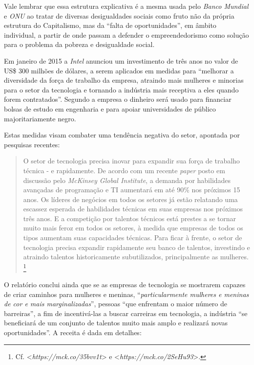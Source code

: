 Vale lembrar que essa estrutura explicativa é a mesma usada pelo
\emph{Banco Mundial} e \emph{ONU} ao tratar de diversas desigualdades
sociais como fruto não da própria estrutura do Capitalismo, mas da
``falta de oportunidades'', em âmbito individual, a partir de onde
passam a defender o empreendedorismo como solução para o problema da
pobreza e desigualdade social.

Em janeiro de 2015 a \emph{Intel} anunciou um investimento de três anos
no valor de US\$ 300 milhões de dólares, a serem aplicados em medidas
para ``melhorar a diversidade da força de trabalho da empresa, atraindo
mais mulheres e minorias para o setor da tecnologia e tornando a
indústria mais receptiva a eles quando forem contratados''. Segundo a
empresa o dinheiro será usado para financiar bolsas de estudo em
engenharia e para apoiar universidades de público majoritariamente
negro.

Estas medidas visam combater uma tendência negativa do setor, apontada
por pesquisas recentes:

\begin{quote}
O setor de tecnologia precisa inovar para expandir sua força de trabalho
técnica - e rapidamente. De acordo com um recente \emph{paper} posto em
discussão pelo \emph{McKinsey Global Institute}, a demanda por
habilidades avançadas de programação e TI aumentará em até 90\% nos
próximos 15 anos. Os líderes de negócios em todos os setores já estão
relatando uma escassez esperada de habilidades técnicas em suas empresas
nos próximos três anos. E a competição por talentos técnicos está
prestes a se tornar muito mais feroz em todos os setores, à medida que
empresas de todos os tipos aumentam suas capacidades técnicas. Para
ficar à frente, o setor de tecnologia precisa expandir rapidamente seu
banco de talentos, investindo e atraindo talentos historicamente
subutilizados, principalmente as mulheres. \footnote{Cf.
  \textless{}\emph{https://mck.co/35bvv1t}\textgreater{}
  e \textless{}\emph{https://mck.co/2SeHu93}\textgreater{}.}
\end{quote}

O relatório conclui ainda que se as empresas de tecnologia se mostrarem
capazes de criar caminhos para mulheres e meninas,
``\emph{particularmente mulheres e meninas de cor e mais
marginalizadas}'', pessoas ``que enfrentam o maior número de
barreiras'', a fim de incentivá-las a buscar carreiras em tecnologia, a
indústria ``se beneficiará de um conjunto de talentos muito mais amplo e
realizará novas oportunidades''. A receita é dada em detalhes:

